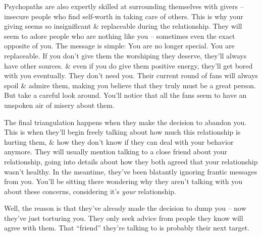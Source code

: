 \documentclass{article}
\numberwithin{equation}{section}
\begin{document}
Psychopaths are also expertly skilled at surrounding themselves with givers -- insecure people who find self-worth in taking care of others. This is why your giving seems so insignificant \& replaceable during the relationship. They will seem to adore people who are nothing like you -- sometimes even the exact opposite of you. The message is simple: You are no longer special. You are replaceable. If you don't give them the worshiping they deserve, they'll always have other sources. \& even if you do give them positive energy, they'll get bored with you eventually. They don't need you. Their current round of fans will always spoil \& admire them, making you believe that they truly must be a great person. But take a careful look around. You'll notice that all the fans seem to have an unspoken air of misery about them.

The final triangulation happens when they make the decision to abandon you. This is when they'll begin freely talking about how much this relationship is hurting them, \& how they don't know if they can deal with your behavior anymore. They will usually mention talking to a close friend about your relationship, going into details about how they both agreed that your relationship wasn't healthy. In the meantime, they've been blatantly ignoring frantic messages from you. You'll be sitting there wondering why they aren't talking with you about these concerns, considering it's \textit{your} relationship.

Well, the reason is that they've already made the decision to dump you -- now they've just torturing you. They only seek advice from people they know will agree with them. That ``friend'' they're talking to is probably their next target.
\end{document}
